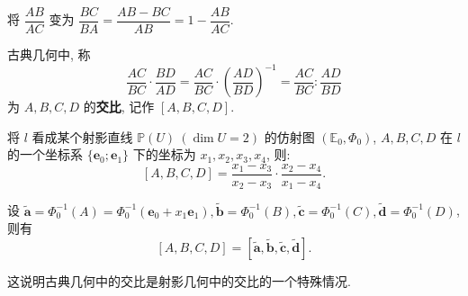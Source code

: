 \documentclass{ctexart}
\begin{document}
将 $\dfrac{AB}{AC}$ 变为 $\dfrac{BC}{BA}=\dfrac{AB-BC}{AB}=1-\dfrac{AB}{AC}$.

古典几何中, 称
\[\dfrac{AC}{BC}\cdot\dfrac{BD}{AD}=\dfrac{AC}{BC}\cdot\left(\dfrac{AD}{BD}\right)^{-1}=\dfrac{AC}{BC}:\dfrac{AD}{BD}\]
为 $A,B,C,D$ 的\textbf{交比}, 记作 $[A,B,C,D]$.

将 $l$ 看成某个射影直线 $\mathbb{P}(U)\ (\dim U=2)$ 的仿射图 $(\mathbb{E}_0,\Phi_0)$, $A,B,C,D$ 在 $l$ 的一个坐标系 $\{\boldsymbol{e}_0;\boldsymbol{e}_1\}$ 下的坐标为 $x_1,x_2,x_3,x_4$, 则:
\[[A,B,C,D]=\dfrac{x_1-x_3}{x_2-x_3}\cdot\dfrac{x_2-x_4}{x_1-x_4}.\]

设 $\tilde{\boldsymbol{a}}=\Phi^{-1}_0(A)=\Phi^{-1}_0(\boldsymbol{e}_0+x_1\boldsymbol{e}_1),\tilde{\boldsymbol{b}}=\Phi^{-1}_0(B),\tilde{\boldsymbol{c}}=\Phi^{-1}_0(C),\tilde{\boldsymbol{d}}=\Phi^{-1}_0(D)$, 则有
\[[A,B,C,D]=[\tilde{\boldsymbol{a}},\tilde{\boldsymbol{b}},\tilde{\boldsymbol{c}},\tilde{\boldsymbol{d}}].\]

这说明古典几何中的交比是射影几何中的交比的一个特殊情况.
\end{document}
